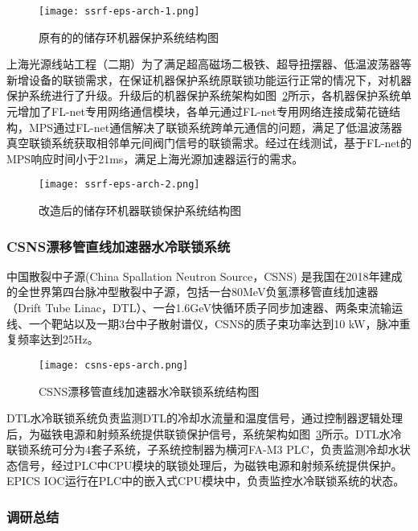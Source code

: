 \begin{figure}[!htb]
	\centering
	\texttt{[image: ssrf-eps-arch-1.png]}
	\caption{原有的的储存环机器保护系统结构图}
	\label{fig:ssrf-eps-arch-1}
\end{figure}

上海光源线站工程（二期）为了满足超高磁场二极铁、超导扭摆器、低温波荡器等新增设备的联锁需求，在保证机器保护系统原联锁功能运行正常的情况下，对机器保护系统进行了升级。升级后的机器保护系统架构如图~\ref{fig:ssrf-eps-arch-2}所示，各机器保护系统单元增加了FL-net专用网络通信模块，各单元通过FL-net专用网络连接成菊花链结构，MPS通过FL-net通信解决了联锁系统跨单元通信的问题，满足了低温波荡器真空联锁系统获取相邻单元间阀门信号的联锁需求。经过在线测试，基于FL-net的MPS响应时间小于21ms，满足上海光源加速器运行的需求。

  \begin{figure}[!htb]
	\centering
	\texttt{[image: ssrf-eps-arch-2.png]}
	\caption{改造后的储存环机器联锁保护系统结构图}
	\label{fig:ssrf-eps-arch-2}
\end{figure}

\subsubsection{CSNS漂移管直线加速器水冷联锁系统}

中国散裂中子源(China Spallation Neutron Source，CSNS) 是我国在2018年建成的全世界第四台脉冲型散裂中子源，包括一台80MeV负氢漂移管直线加速器（Drift Tube Linac，DTL）、一台1.6GeV快循环质子同步加速器、两条束流输运线、一个靶站以及一期3台中子散射谱仪，CSNS的质子束功率达到10 kW，脉冲重复频率达到25Hz。

  \begin{figure}[!htb]
	\centering
	\texttt{[image: csns-eps-arch.png]}
	\caption{CSNS漂移管直线加速器水冷联锁系统结构图}
	\label{fig:csns-eps-arch}
\end{figure}


DTL水冷联锁系统负责监测DTL的冷却水流量和温度信号，通过控制器逻辑处理后，为磁铁电源和射频系统提供联锁保护信号，系统架构如图~\ref{fig:csns-eps-arch}所示。DTL水冷联锁系统可分为4套子系统，子系统控制器为横河FA-M3 PLC，负责监测冷却水状态信号，经过PLC中CPU模块的联锁处理后，为磁铁电源和射频系统提供保护。EPICS IOC运行在PLC中的嵌入式CPU模块中，负责监控水冷联锁系统的状态\cite{he2017}。



\subsubsection{调研总结}

